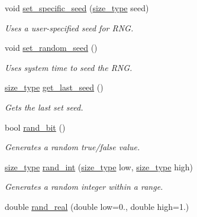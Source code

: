 \begin{DoxyCompactItemize}
\item 
void \hyperlink{classretrocombinator_1_1RandMaths_a0bf1c2e7a1eccb1f9246b3fceeb5db8a}{set\+\_\+specific\+\_\+seed} (\hyperlink{constants_8h_a8e1541b50cee66a791df4c437ccbb385}{size\+\_\+type} seed)
\begin{DoxyCompactList}\small\item\em Uses a user-\/specified seed for R\+NG. \end{DoxyCompactList}\item 
void \hyperlink{classretrocombinator_1_1RandMaths_a2b61e31de6067ffa35531d5bde40f4c6}{set\+\_\+random\+\_\+seed} ()
\begin{DoxyCompactList}\small\item\em Uses system time to seed the R\+NG. \end{DoxyCompactList}\item 
\hyperlink{constants_8h_a8e1541b50cee66a791df4c437ccbb385}{size\+\_\+type} \hyperlink{classretrocombinator_1_1RandMaths_ae3a186a8f3124cbfc698eeae09b708a0}{get\+\_\+last\+\_\+seed} ()
\begin{DoxyCompactList}\small\item\em Gets the last set seed. \end{DoxyCompactList}\item 
\mbox{\label{classretrocombinator_1_1RandMaths_a4f82863502ca04438a331fd309ca8b5e}} 
bool \hyperlink{classretrocombinator_1_1RandMaths_a4f82863502ca04438a331fd309ca8b5e}{rand\+\_\+bit} ()
\begin{DoxyCompactList}\small\item\em Generates a random true/false value. \end{DoxyCompactList}\item 
\hyperlink{constants_8h_a8e1541b50cee66a791df4c437ccbb385}{size\+\_\+type} \hyperlink{classretrocombinator_1_1RandMaths_a8072bad64e64ef042e5257e1bee85635}{rand\+\_\+int} (\hyperlink{constants_8h_a8e1541b50cee66a791df4c437ccbb385}{size\+\_\+type} low, \hyperlink{constants_8h_a8e1541b50cee66a791df4c437ccbb385}{size\+\_\+type} high)
\begin{DoxyCompactList}\small\item\em Generates a random integer within a range. \end{DoxyCompactList}\item 
double \hyperlink{classretrocombinator_1_1RandMaths_aa6441baa59bff50f588c0c54e3c54140}{rand\+\_\+real} (double low=0., double high=1.)

\end{DoxyCompactItemize}
